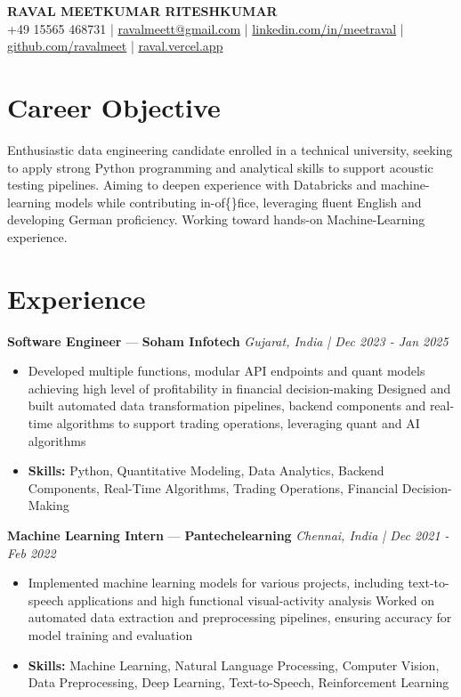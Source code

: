 \documentclass[a4paper,10pt]{article}
\begin{document}
\begin{center}
  {\Large\bfseries RAVAL MEETKUMAR RITESHKUMAR}\\[2pt]
  {\small +49 15565 468731 \;|\; \href{mailto:ravalmeett@gmail.com}{ravalmeett@gmail.com} \;|\; \href{https://www.linkedin.com/in/meetraval/}{linkedin.com/in/meetraval} \;|\; \href{https://github.com/ravalmeet}{github.com/ravalmeet} \;|\; \href{https://raval.vercel.app/}{raval.vercel.app}}
\end{center}
\vspace{-3pt}

\section*{Career Objective}
Enthusiastic data engineering candidate enrolled in a technical university, seeking to apply strong Python programming and analytical skills to support acoustic testing pipelines. Aiming to deepen experience with Databricks and machine-learning models while contributing in-of\{\}fice, leveraging fluent English and developing German proficiency. Working toward hands-on Machine-Learning experience.\par

\section*{Experience}
\textbf{Software Engineer} — \textbf{Soham Infotech} \hfill \textit{Gujarat, India \;|\; Dec 2023 - Jan 2025}\par
\vspace{1pt}
\begin{itemize}
  \item Developed multiple functions, modular API endpoints and quant models achieving high level of profitability in financial decision-making Designed and built automated data transformation pipelines, backend components and real-time algorithms to support trading operations, leveraging quant and AI algorithms
  \item \textbf{Skills:} Python, Quantitative Modeling, Data Analytics, Backend Components, Real-Time Algorithms, Trading Operations, Financial Decision-Making
\end{itemize}
\vspace{3pt}
\textbf{Machine Learning Intern} — \textbf{Pantechelearning} \hfill \textit{Chennai, India \;|\; Dec 2021 - Feb 2022}\par
\vspace{1pt}
\begin{itemize}
  \item Implemented machine learning models for various projects, including text-to-speech applications and high functional visual-activity analysis Worked on automated data extraction and preprocessing pipelines, ensuring accuracy for model training and evaluation
  \item \textbf{Skills:} Machine Learning, Natural Language Processing, Computer Vision, Data Preprocessing, Deep Learning, Text-to-Speech, Reinforcement Learning
\end{itemize}
\end{document}

